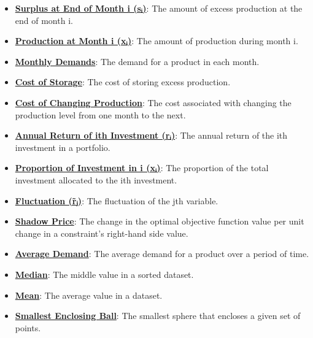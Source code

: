 \documentclass{article}%
\begin{document}
\begin{itemize}[leftmargin=*]
\item \href{https://www.math.purdue.edu/~yipn/421/2024-11-14-NetAppls.pdf#page=7}{\textbf{Surplus at End of Month i (sᵢ)}}: The amount of excess production at the end of month i.%
\item \href{https://www.math.purdue.edu/~yipn/421/2024-11-14-NetAppls.pdf#page=7}{\textbf{Production at Month i (xᵢ)}}: The amount of production during month i.%
\item \href{https://www.math.purdue.edu/~yipn/421/2024-11-14-NetAppls.pdf#page=7}{\textbf{Monthly Demands}}: The demand for a product in each month.%
\item \href{https://www.math.purdue.edu/~yipn/421/2024-11-14-NetAppls.pdf#page=7}{\textbf{Cost of Storage}}: The cost of storing excess production.%
\item \href{https://www.math.purdue.edu/~yipn/421/2024-11-14-NetAppls.pdf#page=7}{\textbf{Cost of Changing Production}}: The cost associated with changing the production level from one month to the next.%
\item \href{https://www.math.purdue.edu/~yipn/421/2024-11-14-NetAppls.pdf#page=7}{\textbf{Annual Return of ith Investment (rᵢ)}}: The annual return of the ith investment in a portfolio.%
\item \href{https://www.math.purdue.edu/~yipn/421/2024-11-14-NetAppls.pdf#page=7}{\textbf{Proportion of Investment in i (xᵢ)}}: The proportion of the total investment allocated to the ith investment.%
\item \href{https://www.math.purdue.edu/~yipn/421/2024-11-14-NetAppls.pdf#page=7}{\textbf{Fluctuation (r̃ⱼ)}}: The fluctuation of the jth variable.%
\item \href{https://www.math.purdue.edu/~yipn/421/2024-11-14-NetAppls.pdf#page=7}{\textbf{Shadow Price}}: The change in the optimal objective function value per unit change in a constraint's right-hand side value.%
\item \href{https://www.math.purdue.edu/~yipn/421/2024-11-14-NetAppls.pdf#page=7}{\textbf{Average Demand}}: The average demand for a product over a period of time.%
\item \href{https://www.math.purdue.edu/~yipn/421/2024-11-14-NetAppls.pdf#page=7}{\textbf{Median}}: The middle value in a sorted dataset.%
\item \href{https://www.math.purdue.edu/~yipn/421/2024-11-14-NetAppls.pdf#page=7}{\textbf{Mean}}: The average value in a dataset.%
\item \href{https://www.math.purdue.edu/~yipn/421/2024-11-14-NetAppls.pdf#page=7}{\textbf{Smallest Enclosing Ball}}: The smallest sphere that encloses a given set of points.%

\end{itemize}
\end{document}
